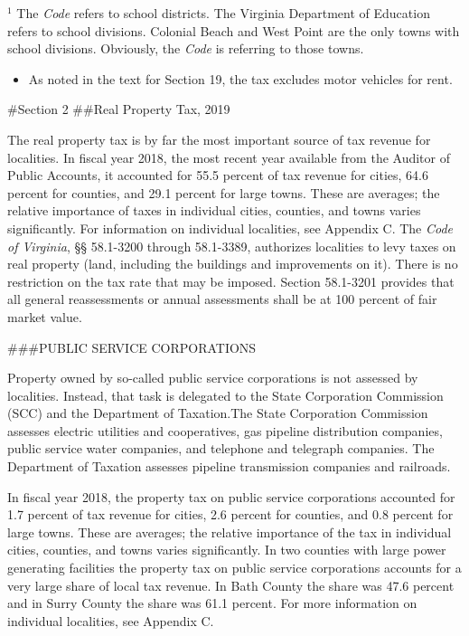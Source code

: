 \documentclass[
]{book}
\providecommand{\tightlist}{%
  \setlength{\itemsep}{0pt}\setlength{\parskip}{0pt}}
\begin{document}
\(^1\) The \emph{Code} refers to school districts. The Virginia Department of Education refers to school divisions. Colonial Beach and West Point are the only towns with school divisions. Obviously, the \emph{Code} is referring to those towns.

\begin{itemize}
\tightlist
\item
  As noted in the text for Section 19, the tax excludes motor vehicles for rent.
\end{itemize}

\#Section 2
\#\#Real Property Tax, 2019

The real property tax is by far the most important source of tax revenue for localities. In fiscal year 2018, the most recent year available from the Auditor of Public Accounts, it accounted for 55.5 percent of tax revenue for cities, 64.6 percent for counties, and 29.1 percent for large towns. These are averages; the relative importance of taxes in individual cities, counties, and towns varies significantly. For information on individual localities, see Appendix C.
The \emph{Code of Virginia}, §§ 58.1-3200 through 58.1-3389, authorizes localities to levy taxes on real property (land, including the buildings and improvements on it). There is no restriction on the tax rate that may be imposed. Section 58.1-3201 provides that all general reassessments or annual assessments shall be at 100 percent of fair market value.

\#\#\#PUBLIC SERVICE CORPORATIONS

Property owned by so-called public service corporations is not assessed by localities. Instead, that task is delegated to the State Corporation Commission (SCC) and the Department of Taxation.The State Corporation Commission assesses electric utilities and cooperatives, gas pipeline distribution companies, public service water companies, and telephone and telegraph companies. The Department of Taxation assesses pipeline transmission companies and railroads.

In fiscal year 2018, the property tax on public service corporations accounted for 1.7 percent of tax revenue for
cities, 2.6 percent for counties, and 0.8 percent for large towns. These are averages; the relative importance of the tax
in individual cities, counties, and towns varies significantly. In two counties with large power generating facilities the
property tax on public service corporations accounts for a very large share of local tax revenue. In Bath County the share was 47.6 percent and in Surry County the share was 61.1 percent. For more information on individual localities, see Appendix C.
\end{document}
